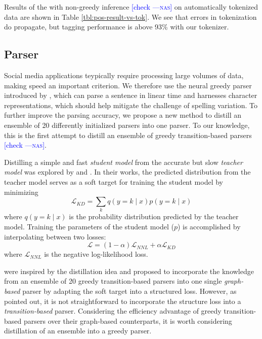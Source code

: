\documentclass[11pt,a4paper]{article}
\newcommand{\nascomment}[1]{\textcolor{blue}{[#1 ---\textsc{nas}]}}
\begin{document}
Results of the \citet{owoputi-EtAl:2013:NAACL-HLT}  with non-greedy
inference \nascomment{check} on automatically tokenized data
are shown in  Table \ref{tbl:pos-result-vs-tok}.  We see that errors
in tokenization do propagate, but tagging performance is above 93\%
with our tokenizer.

\subsection{Parser}

Social media applications teypically require processing large volumes
of data, making speed an important criterion. We therefore 
use the neural greedy parser introduced by ,
which can parse a sentence in linear time and harnesses 
character representations, which should help mitigate the challenge of
spelling variation. To further improve the parsing accuracy,
we propose a new method to distill an ensemble of 20 differently
initialized parsers into one parser.  To our knowledge, this is the
first attempt to distill an ensemble of greedy transition-based
parsers \nascomment{check}.

Distilling a simple and fast {\it student model} from the accurate but
slow {\it teacher model} was explored by 
and . In their works, the predicted
distribution from the teacher model serves as a soft target for
training the student model by minimizing
\begin{equation}
\mathcal{L}_{\mathit{KD}} = \sum_k q(y=k\mid x) p(y=k\mid x)
\end{equation} where $q(y=k\mid x)$ is the probability distribution
predicted by the teacher model. Training the parameters of the student model ($p$) is
accomplished by interpolating between two losses:
\begin{equation}\label{eq:distill}
\mathcal{L}=(1-\alpha)\mathcal{L}_{\mathit{NNL}} + \alpha\mathcal{L}_{\mathit{KD}}
\end{equation}
where $\mathcal{L}_{\mathit{NNL}}$ is the negative log-likelihood loss.

 were inspired by the distillation idea and
proposed to incorporate the knowledge from an ensemble of 20 greedy transition-based
parsers into one single \emph{graph-based} parser by adapting the soft
target into a structured loss. However, as 
pointed out, it is not straightforward to incorporate the structure
loss into a \emph{transition-based} parser. Considering the efficiency
advantage of greedy transition-based parsers over their graph-based counterparts,
it is worth considering distillation of an ensemble into a greedy parser.
\end{document}
